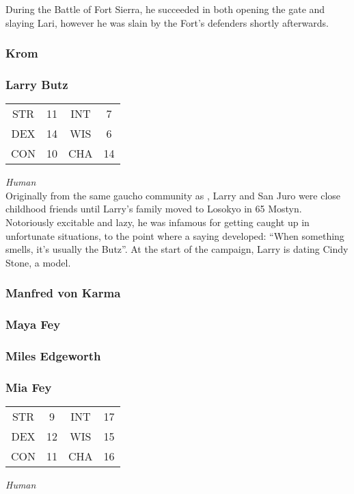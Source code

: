 During the Battle of Fort Sierra, he succeeded in both opening the gate and slaying Lari, however he was slain by the Fort's defenders shortly afterwards. 

\subsubsection{Krom}
\label{people:chrom}



\subsubsection{Larry Butz}
\label{people:larry}
\begin{center}
\begin{tabular}{c c|c c}
STR & 11 & INT & 7\\
DEX & 14 & WIS & 6 \\
CON & 10 & CHA & 14 \end{tabular}\end{center}
\textit{Human}\\
Originally from the same gaucho community as , Larry and San Juro were close childhood friends until Larry's family moved to Losokyo in 65 Mostyn. Notoriously excitable and lazy, he was infamous for getting caught up in unfortunate situations, to the point where a saying developed: ``When something smells, it's usually the Butz''. At the start of the campaign, Larry is dating Cindy Stone, a model.

\subsubsection{Manfred von Karma}
\label{people:mvonkarma}

\subsubsection{Maya Fey}
\label{people:mayafey}

\subsubsection{Miles Edgeworth}
\label{people:miles}

\subsubsection{Mia Fey}
\label{people:miafey}
\begin{center}
\begin{tabular}{c c|c c}
STR & 9 & INT & 17\\
DEX & 12 & WIS & 15 \\
CON & 11 & CHA & 16 \end{tabular}\end{center}
\textit{Human}\\



